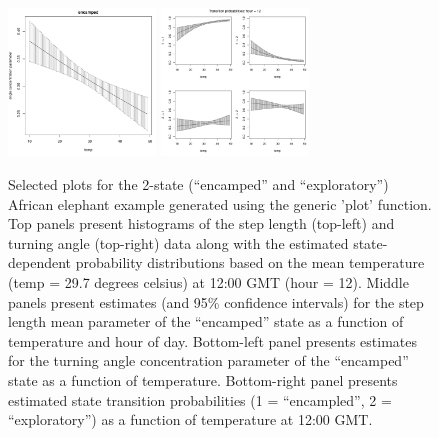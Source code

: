 \documentclass[12pt]{article}\usepackage[]{graphicx}\usepackage[]{color}
\begin{document}
\begin{figure}[htbp]
  \includegraphics[width=0.35\textwidth]{plot_elephantResults010.pdf}
  \includegraphics[width=0.35\textwidth]{plot_elephantResults013.pdf} \\
  \caption{Selected plots for the 2-state (``encamped'' and ``exploratory'') African elephant example generated using the generic 'plot' function. Top panels present histograms of the step length (top-left) and turning angle (top-right) data along with the estimated state-dependent probability distributions based on the mean temperature (temp = 29.7 degrees celsius) at 12:00 GMT (hour = 12). Middle panels present estimates (and 95\% confidence intervals) for the step length mean parameter of the ``encamped'' state as a function of temperature and hour of day.  Bottom-left panel presents estimates for the turning angle concentration parameter of the ``encamped'' state as a function of temperature.  Bottom-right panel presents estimated state transition probabilities (1 = ``encampled'', 2 = ``exploratory'') as a function of temperature at 12:00 GMT.}
  \label{fig:elephantResults2}
\end{figure}
\end{document}
